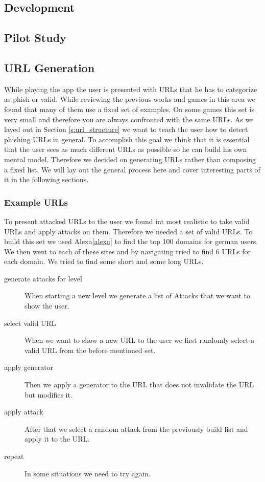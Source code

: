 \subsection{Development}
\subsection{Pilot Study}
\subsection{URL Generation}
While playing the app the user is presented with URLs that he has to categorize as phish or valid.
While reviewing the previous works and games in this area we found that many of them use a fixed set of examples.
On some games this set is very small and therefore you are always confronted with the same URLs.
As we layed out in Section \ref{s:url_structure} we want to teach the user how to detect phishing URLs in general.
To accomplish this goal we think that it is essential that the user sees as much different URLs as possible so he can build his own mental model.
Therefore we decided on generating URLs rather than composing a fixed list.
We will lay out the general process here and cover interesting parts of it in the following sections.
\subsubsection{Example URLs}
To present attacked URLs to the user we found int most realistic to take valid URLs and apply attacks on them.
Therefore we needed a set of valid URLs.
To build this set we used Alexa\ref{alexa} to find the top 100 domains for german users.
We then went to each of these sites and by navigating tried to find 6 URLs for each domain.
We tried to find some short and some long URLs.
\begin{description}
\item[generate attacks for level]When starting a new level we generate a list of Attacks that we want to show the user.
\item[select valid URL]When we want to show a new URL to the user we first randomly select a valid URL from the before mentioned set.
\item[apply generator]Then we apply a generator to the URL that does not invalidate the URL but modifies it.
\item[apply attack]After that we select a random attack from the previously build list and apply it to the URL.
\item[repeat]In some situations we need to try again.
\end{description}
